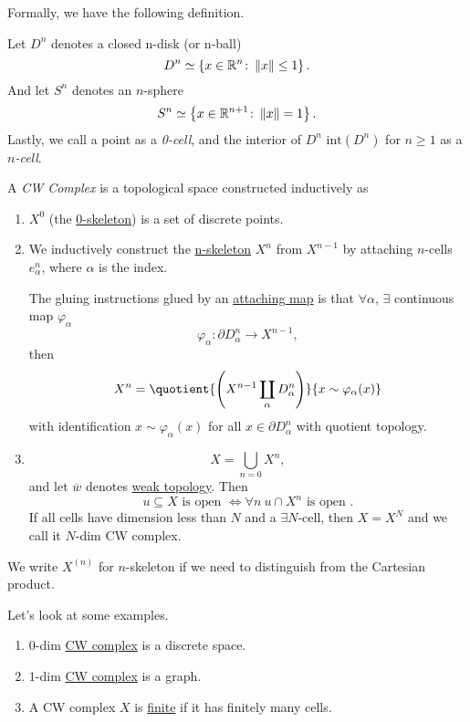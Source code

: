\hr

Formally, we have the following definition.
\begin{notation}
	Let \(D^n\) denotes a closed n-disk (or n-ball)
	\[
		D^n\simeq \left\{x\in\mathbb{\MakeUppercase{R}} ^n\colon \left\lVert x\right\rVert \leq 1\right\}.
	\]
	And let \(S^n\) denotes an \(n\)-sphere
	\[
		S^n\simeq \left\{x\in \mathbb{\MakeUppercase{R}}^{n+1}\colon \left\lVert x\right\rVert = 1\right\}.
	\]
	Lastly, we call a point as a \emph{0-cell}, and the interior of \(D^n\) \(\mathrm{int}(D^n)\) for \(n\geq 1\) as a \emph{\(n\)-cell}.
\end{notation}
\begin{definition}[CW Complex]\label{def:CW-Complex}
	A \emph{CW Complex} is a topological space constructed inductively as
	\begin{enumerate}
		\item \(X^0\) (the \underline{0-skeleton}) is a set of discrete points.
		\item We inductively construct the \underline{n-skeleton} \(X^n\) from \(X^{n-1}\) by attaching \(n\)-cells \(e^n_{\alpha}\), where
		      \(\alpha\) is the index.
		      \par The gluing instructions glued by an \underline{attaching map} is that \(\forall \alpha\), \(\exists \) continuous map \(\varphi_{\alpha}\)
		      \[
			      \varphi_{\alpha}\colon \partial D^n_{\alpha}\to X^{n-1},
		      \]
		      then
		      \[
			      X^n = \quotient{\left(X^{n-1}\coprod\limits_{\alpha}D^n_\alpha\right)}{x\sim \varphi_{\alpha}(x)}
		      \]
		      with identification \(x\sim \varphi_{\alpha}(x)\) for all \(x\in \partial D^n_{\alpha}\) with quotient topology.
		\item
		      \[
			      X = \bigcup\limits_{n=0} X^n,
		      \]
		      and let \(\overline{w} \) denotes \underline{weak topology}. Then
		      \[
			      u\subseteq X \text{ is open }\iff \forall n\ u\cap X^n \text{ is open }.
		      \]
		      If all cells have dimension less than \(N\) and a \(\exists N\)-cell, then \(X = X^N\) and we call it \(N\)-dim CW complex.
	\end{enumerate}
\end{definition}

\begin{remark}
	We write \(X^{(n)}\) for \(n\)-skeleton if we need to distinguish from the Cartesian product.
\end{remark}

\begin{eg}
	Let's look at some examples.
	\begin{enumerate}
		\item \(0\)-dim \hyperref[def:CW-Complex]{CW complex} is a discrete space.
		\item \(1\)-dim \hyperref[def:CW-Complex]{CW complex} is a graph.
		\item A CW complex \(X\) is \underline{finite} if it has finitely many cells.
	\end{enumerate}
\end{eg}

